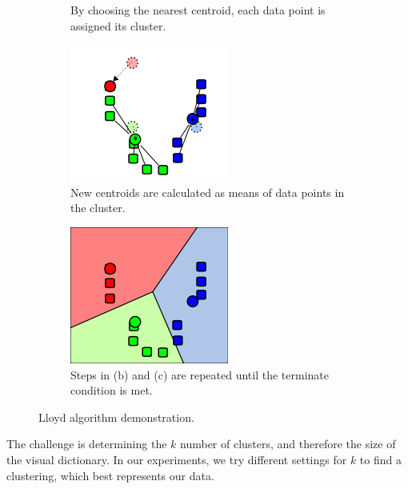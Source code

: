 \begin{figure}[ht]
\begin{subfigure}[t]{0.22\textwidth}
        \caption{By choosing the nearest centroid, each data point is assigned its cluster.}
        \label{fig:k-means-alg:assignment_step}
    \end{subfigure}\hfill
    \begin{subfigure}[t]{0.22\textwidth}
        \includegraphics[width=\textwidth]{Figures/k-means/k-means_update_step.png}
        \caption{New centroids are calculated as means of data points in the cluster.}
        \label{fig:k-means-alg:update_step}
    \end{subfigure}\hfill
    \begin{subfigure}[t]{0.22\textwidth}
        \includegraphics[width=\textwidth]{Figures/k-means/k-means_assignment_step_2.png}
        \caption{Steps in (b) and (c) are repeated until the terminate condition is met.}
        \label{fig:k-means-alg:assignment_step_2}
    \end{subfigure}\hfill
    \caption[Lloyd's algorithm demonstration.]{Lloyd algorithm demonstration. \cite{Wikikmeans}}
    \label{fig:k_means_alg}
\end{figure}
The challenge is determining the $k$ number of clusters, and therefore the size of the visual dictionary. In our experiments, we try different settings for $k$ to find a clustering, which best represents our data.
